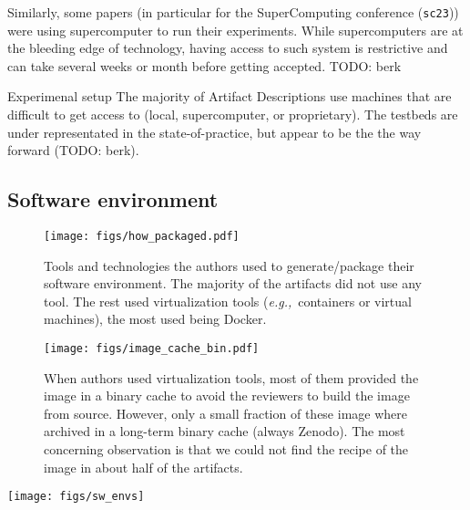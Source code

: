 \documentclass[sigconf,natbib=false]{acmart}
\newcommand{\eg}{\emph{e.g.,}}
\newcommand{\ad}{Artifact Description}
\newcommand{\aeval}{Artifact Evaluation}
\newcommand{\todo}[1]{{\color{red}TODO: #1}}
\begin{document}
Similarly, some papers (in particular for the SuperComputing conference (\texttt{sc23})) were using supercomputer to run their experiments.
While supercomputers are at the bleeding edge of technology, having access to such system is restrictive and can take several weeks or month before getting accepted.
\todo{berk}

\begin{lesson}{Experimenal setup}{}
  The majority of \ad s use machines that are difficult to get access to (local, supercomputer, or proprietary). 
  The testbeds are under representated in the state-of-practice, but appear to be the the way forward \cite{nussbaum2017testbeds} (\todo{berk}).
\end{lesson}

\subsection{Software environment}\label{sec:sop:sw}

\begin{figure*}
  \centering
  \begin{subfigure}{0.49\textwidth}
    \centering
    \texttt{[image: figs/how\_packaged.pdf]}
    \caption{Tools and technologies the authors used to generate/package their software environment. The majority of the artifacts did not use any tool. The rest used virtualization tools (\eg\ containers or virtual machines), the most used being Docker.}\label{fig:techno}
  \end{subfigure}
  \hfill
  \begin{subfigure}{0.49\textwidth}
      \centering
      \texttt{[image: figs/image\_cache\_bin.pdf]}
    \caption{When authors used virtualization tools, most of them provided the image in a binary cache to avoid the reviewers to build the image from source. However, only a small fraction of these image where archived in a long-term binary cache (always Zenodo). The most concerning observation is that we could not find the recipe of the image in about half of the artifacts.}\label{fig:cache_bin}
  \end{subfigure}
  \caption{Tools and technologies used to generate and package the software environment for the \aeval\ (Figure \ref{fig:techno}), and state of the image and its recipe in the case of the use of virtual tools (Figure \ref{fig:cache_bin}).}\label{fig:techo_cache}
\end{figure*}

\begin{figure*}
  \centering
  \texttt{[image: figs/sw\_envs]}
  \caption{Techniques used to share the software environment in the \ad s. Note than an paper can use several of these techniques.}\label{fig:sw_envs}
\end{figure*}
\end{document}
